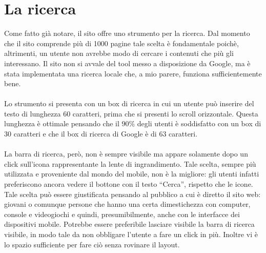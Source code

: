 \documentclass[../ProgettoTecWeb2.tex]{subfiles}
\begin{document}
\section{La ricerca}
	Come fatto già notare, il sito offre uno strumento per la ricerca. Dal momento che il sito comprende più di 1000 pagine tale scelta è fondamentale poichè, altrimenti, un utente non avrebbe modo di cercare i contenuti che più gli interessano. Il sito non si avvale del tool messo a disposizione da Google, ma è stata implementata una ricerca locale che, a mio parere, funziona sufficientemente bene. 

	\paragraph{}
	Lo strumento si presenta con un box di ricerca in cui un utente può inserire del testo di lunghezza 60 caratteri, prima che si presenti lo scroll orizzontale. Questa lunghezza è ottimale pensando che il 90\% degli utenti è soddisfatto con un box di 30 caratteri e che il box di ricerca di Google è di 63 caratteri.

	\paragraph{}
	La barra di ricerca, però, non è sempre visibile ma appare solamente dopo un click sull'icona rappresentante la lente di ingrandimento. Tale scelta, sempre più utilizzata e proveniente dal mondo del mobile, non è la migliore: gli utenti infatti preferiscono ancora vedere il bottone con il testo ``Cerca'', rispetto che le icone. Tale scelta può essere giustificata pensando al pubblico a cui è diretto il sito web: giovani o comunque persone che hanno una certa dimestichezza con computer, console e videogiochi e quindi, presumibilmente, anche con le interfacce dei dispositivi mobile. Potrebbe essere preferibile lasciare visibile la barra di ricerca visibile, in modo tale da non obbligare l'utente a fare un click in più. Inoltre vi è lo spazio sufficiente per fare ciò senza rovinare il layout.
\end{document}
